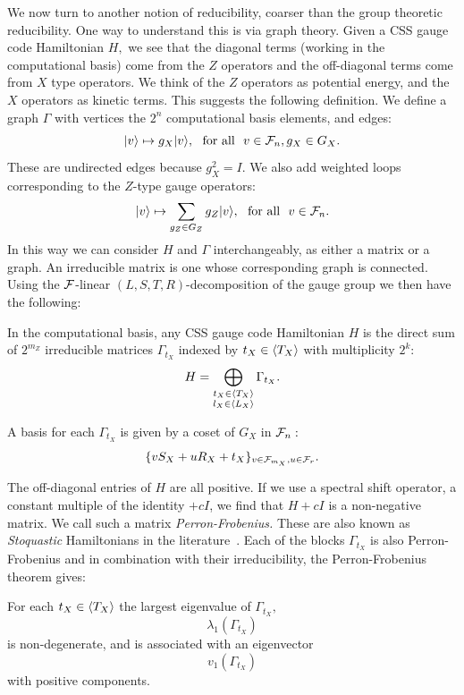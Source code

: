 We now turn to another notion of reducibility, coarser than
the group theoretic reducibility.
One way to understand this is via graph theory.
Given a CSS gauge code Hamiltonian $H,$ 
we see that 
the diagonal terms (working in the computational basis)
come from the $Z$ operators and the off-diagonal terms
come from $X$ type operators.
We think of the $Z$ operators as potential energy, and the
$X$ operators as kinetic terms.
This suggests the following definition.
We define a graph $\Gamma$ with vertices the $2^n$ computational
basis elements, and edges:
$$
    |{v}\rangle \mapsto g_X |{v}\rangle, \ \ \mbox{for all}\ \  v\in\mathcal{F}_{n}, g_X\in G_X.
$$
These are undirected edges because $g_X^2 = I.$
We also add weighted loops corresponding to the $Z$-type gauge operators:
$$
    |{v}\rangle \mapsto \sum_{g_Z\in G_Z} g_Z |{v}\rangle, \ \ \mbox{for all}\ \  v\in\mathcal{F}_{n}.
$$
In this way we can consider $H$ and $\Gamma$ interchangeably,
as either a matrix or a graph.
An irreducible matrix is one whose corresponding graph is connected.
Using the $\mathcal{F}$-linear $(L,S,T,R)$-decomposition of the gauge group
we then have the following:
\begin{framed}
\noindent In the computational basis, any CSS gauge code
Hamiltonian $H$ is the direct sum of $2^{m_Z}$
irreducible matrices $\Gamma_{t_X}$
indexed by $t_X\in\langle T_X \rangle$
with multiplicity $2^k$:
$$
    H = \bigoplus_{
    \substack{t_X\in\langle T_X \rangle\\l_X\in\langle L_X \rangle}}
        \Gamma_{t_X}.
$$
\end{framed}
A basis for each $\Gamma_{t_X}$ is given by a coset
of $G_X$ in $\mathcal{F}_{n}:$
$$
    \{ v S_X + u R_X + t_X \}_{v\in \mathcal{F}_{m_X}, u\in\mathcal{F}_{r}}.
$$


The off-diagonal entries of $H$ are all positive.
If we use a spectral shift operator, a constant multiple of the identity $+cI$,
we find that $H+cI$ is a non-negative matrix. 
We call such a matrix \emph{Perron-Frobenius.}
These are also known as \emph{Stoquastic} Hamiltonians
in the literature~\cite{Bravyi2008}.
Each of the blocks $\Gamma_{t_X}$ is also Perron-Frobenius
and in combination with their irreducibility, the Perron-Frobenius
theorem gives:
\begin{framed}
\noindent For each $t_X\in\langle T_X \rangle$
the largest eigenvalue 
of $\Gamma_{t_X},$
$$\lambda_1(\Gamma_{t_X})
$$
is non-degenerate,
and is associated with an eigenvector 
$$v_1(\Gamma_{t_X})
$$
with positive components.
\end{framed}

